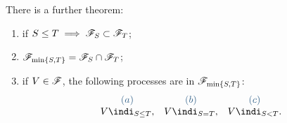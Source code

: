 \documentclass{report}
\begin{document}
There is a further theorem:
\begin{theorem}
	\begin{enumerate}[\circnum]
		\item if $S\leq T\implies\mathscr{F}_S\subset\mathscr{F}_T$;
		\item $\mathscr{F}_{\min\{S,T\}}=\mathscr{F}_S\cap\mathscr{F}_T$;
		\item if $V\in\mathscr{F}$, the following processes are in $\mathscr{F}_{\min\{S,T\}}$:
		\begin{equation*}
			\begin{array}{c c c}
				\color{SteelBlue4}(a)&\color{SteelBlue4}(b)&\color{SteelBlue4}(c)\\
				V\indi_{S\leq T},&V\indi_{S=T},&V\indi_{S< T}.
			\end{array}
		\end{equation*}
	\end{enumerate}
\end{theorem}
\end{document}
